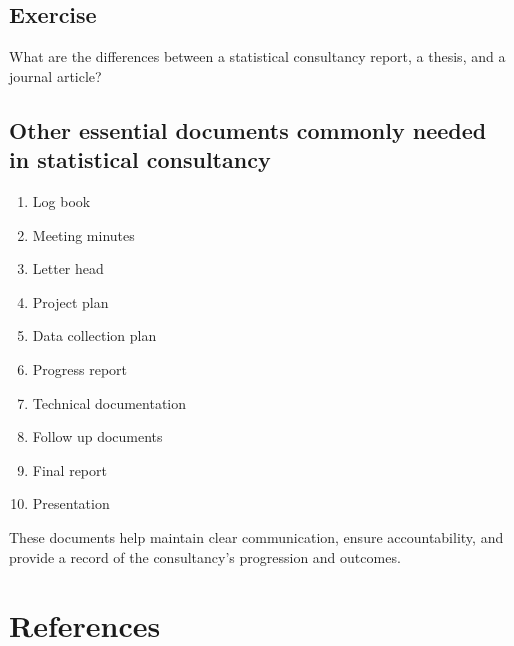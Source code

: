 \documentclass[
  letterpaper,
  DIV=11,
  numbers=noendperiod]{scrreprt}
\newlength{\cslhangindent}
\newenvironment{CSLReferences}[2] %
 {\begin{list}{}{%
  \setlength{\itemindent}{0pt}
  \setlength{\leftmargin}{0pt}
  \setlength{\parsep}{0pt}
  \ifodd #1
   \setlength{\leftmargin}{\cslhangindent}
   \setlength{\itemindent}{-1\cslhangindent}
  \fi
  \setlength{\itemsep}{#2\baselineskip}}}
 {\end{list}}
\begin{document}
\section{Exercise}\label{exercise-3}

What are the differences between a statistical consultancy report, a
thesis, and a journal article?

\section{Other essential documents commonly needed in statistical
consultancy}\label{other-essential-documents-commonly-needed-in-statistical-consultancy}

\begin{enumerate}
\def\labelenumi{\arabic{enumi}.}
\item
  Log book
\item
  Meeting minutes
\item
  Letter head
\item
  Project plan
\item
  Data collection plan
\item
  Progress report
\item
  Technical documentation
\item
  Follow up documents
\item
  Final report
\item
  Presentation
\end{enumerate}

These documents help maintain clear communication, ensure
accountability, and provide a record of the consultancy's progression
and outcomes.


\chapter*{References}\label{references}


\label{refs}
\begin{CSLReferences}{0}{1}
\end{CSLReferences}
\end{document}
